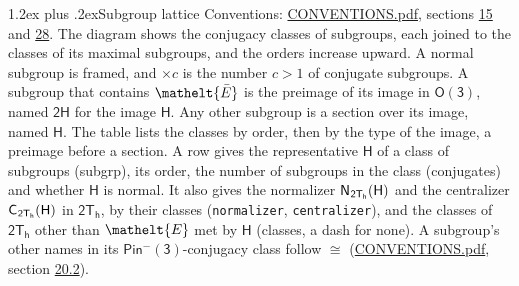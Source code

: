 \documentclass[10pt,a4paper]{article}
\makeatletter
\renewcommand\section{\@startsection{section}{1}{\z@}{-3ex plus -1ex minus -.2ex}%
  {1.2ex plus .2ex}{\normalfont\large\sffamily\bfseries\color{parttitle}}}
\numberwithin{equation}{section}
\newcommand{\eltfont}[1]{{\let\sigma\eltsigma\mathelt{#1}}}
\newcommand{\grp}[1]{\mathsf{#1}}
\newcommand{\cls}[1]{\eltfont{#1}}
\newcommand{\elt}[1]{\eltfont{#1}}
\newcommand{\samecls}{\cong}
\newcommand{\barred}[1]{\bar{#1}}
\newcommand{\hairsp}{\mkern1mu}
\makeatother
\begin{document}
\section{Subgroup lattice}\label{s:subgroups}
Conventions: \href{../../CONVENTIONS.pdf}{CONVENTIONS.pdf}, sections \href{../../../rotation/CONVENTIONS.pdf\#conv.15}{15} and \href{../../CONVENTIONS.pdf\#conv.28}{28}.
The diagram shows the conjugacy classes of subgroups, each joined to the classes of its maximal subgroups, and the orders increase upward. A normal subgroup is framed, and ${\times}c$ is the number $c > 1$ of conjugate subgroups. \label{n:group.H}A subgroup that contains $\elt{\barred{E}}$ is the preimage of its image in $\grp{O(3)}$, named $\grp{2H}$ for the image $\grp{H}$. Any other subgroup is a section over its image, named $\grp{H}$. The table lists the classes by order, then by the type of the image, a preimage before a section. \label{n:head.subgroup}\label{n:head.order}\label{n:head.conjugates}\label{n:head.normal}A row gives the representative $\grp{H}$ of a class of subgroups (subgrp), its order, the number of subgroups in the class (conjugates) and whether $\grp{H}$ is normal. \label{n:group.normalizer}\label{n:group.centralizer}\label{n:head.classes}It also gives the normalizer $\grp{N}_{\hairsp \grp{2T_{h}}}(\grp{H})$ and the centralizer $\grp{C}_{\hairsp \grp{2T_{h}}}(\grp{H})$ in $\grp{2T_{h}}$, by their classes (\texttt{normalizer}, \texttt{centralizer}), and the classes of $\grp{2T_{h}}$ other than $\cls{E}$ met by $\grp{H}$ (classes, a dash for none). A subgroup's other names in its \href{Pinminus3.pdf}{$\grp{Pin^{-}(3)}$}-conjugacy class follow $\samecls$ (\href{../../CONVENTIONS.pdf}{CONVENTIONS.pdf}, section \href{../../CONVENTIONS.pdf\#conv.20.2}{20.2}).
\end{document}
